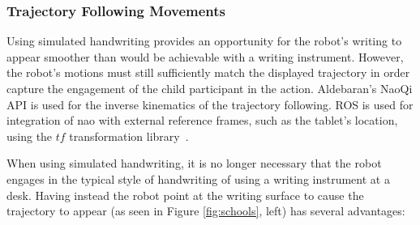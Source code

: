 \documentclass{article}
\begin{document}
%
%
%
%    
%
%
%

\subsubsection*{Trajectory Following Movements}

Using simulated handwriting provides an opportunity for the robot's writing to
appear smoother than would be achievable with a writing instrument. However, the
robot's motions must still sufficiently match the displayed trajectory in order
capture the engagement of the child participant in the action. Aldebaran's NaoQi
API is used for the inverse kinematics of the trajectory following. ROS is used
for integration of {\sc nao} with external reference frames, such as the
tablet's location, using the $tf$ transformation library~\cite{Foote2013}.

When using simulated handwriting, it is no longer necessary that the robot
engages in the typical style of handwriting of using a writing instrument at a
desk. Having instead the robot point at the writing surface to cause the
trajectory to appear (as seen in Figure \ref{fig:schools}, left) has several advantages:
\end{document}
